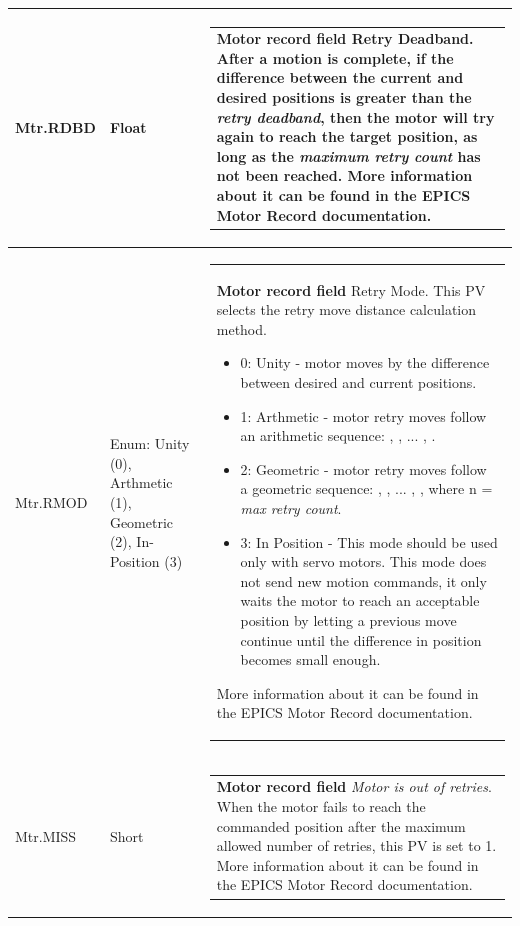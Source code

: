 \documentclass[openany]{article}
\begin{document}
\begin{longtable}{| m{4.5cm} m{2.5cm}  m{8.5cm} |}
        Mtr.RDBD & Float & \begin{tabular}{@{}m{6cm}@{}}
                \textbf{\color{ForestGreen} Motor record field} Retry Deadband. After a motion is complete, if the difference between the current and desired positions is greater than the \emph{retry deadband}, then the motor will try again to reach the target position, as long as the \emph{maximum retry count} has not been reached. More information about it can be found in the EPICS Motor Record documentation.
            \end{tabular} \hypertarget{pv:mtr-rmod}{}\\ \hline
        Mtr.RMOD & Enum: Unity (0), Arthmetic (1), Geometric (2), In-Position (3) & \begin{tabular}{@{}m{6cm}@{}}
                \textbf{\color{ForestGreen} Motor record field} Retry Mode. This PV selects the retry move distance calculation method.
                \begin{itemize}
                    \item 0: Unity - motor moves by the difference between desired and current positions.
                    \item 1: Arthmetic - motor retry moves follow an arithmetic sequence: $positionDiff \times 1$, $positionDiff \times\frac{maxRetryCount - 1}{maxRetryCount}$, ... , $positionDiff \times\frac{1}{maxRetryCount}$.
                    \item 2: Geometric - motor retry moves follow a geometric sequence: $positionDiff \times 1$, $positionDiff \times\frac{1}{2}$, ... , $positionDiff \times\frac{1}{2^{n}}$, where n = \emph{max retry count}.
                    \item 3: In Position - This mode should be used only with servo motors. This mode does not send new motion commands, it only waits the motor to reach an acceptable position by letting a previous move continue until the difference in position becomes small enough.
                \end{itemize}
More information about it can be found in the EPICS Motor Record documentation.
            \end{tabular} \hypertarget{pv:mtr-miss}{}\\ \hline
        Mtr.MISS & Short & \begin{tabular}{@{}m{6cm}@{}}
                \textbf{\color{ForestGreen} Motor record field} \emph{Motor is out of retries}. When the motor fails to reach the commanded position after the maximum allowed number of retries, this PV is set to 1. More information about it can be found in the EPICS Motor Record documentation.

\end{tabular}
\end{longtable}
\end{document}
